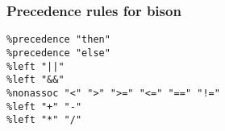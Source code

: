 \documentclass{article}
\begin{document}
\subsubsection*{Precedence rules for bison}

\begin{lstlisting}
%precedence "then" 
%precedence "else"
%left "||"
%left "&&"
%nonassoc "<" ">" ">=" "<=" "==" "!="
%left "+" "-" 
%left "*" "/"

\end{lstlisting}
\end{document}
